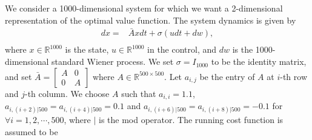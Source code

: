 \documentclass[letterpaper]{article} %
\begin{document}
We consider a 1000-dimensional system for which we want a 2-dimensional representation of the optimal value function. The system dynamics is given by
\begin{equation}
\label{eq:1000d_system_experiment}
\begin{aligned}
    dx = & \bar A x dt+ \sigma ( udt + dw), \\
\end{aligned}
\end{equation}
where $x \in \mathbb{R}^{1000}$ is the state, $u \in \mathbb{R}^{1000}$ in the control, and $dw$ is the 1000-dimensional standard Wiener process. We set $\sigma = I_{1000}$ to be the identity matrix, and set $\bar A = \left[\begin{array}{l|l}
A & 0 \\
\hline 0 & A
\end{array}\right]$ where $A \in \mathbb{R}^{500 \times 500}$. Let $a_{i,j}$ be the entry of $A$ at $i$-th row and $j$-th column. We choose $A$ such that $a_{i,i} = 1.1$, $a_{i,(i+2) | 500} = a_{i,(i+4) | 500} = 0.1$ and $a_{i,(i+6) | 500} = a_{i,(i+8) | 500} = -0.1$ for $\forall i = 1,2, \cdots, 500$, where $|$ is the mod operator. The running cost function is assumed to be
\end{document}

